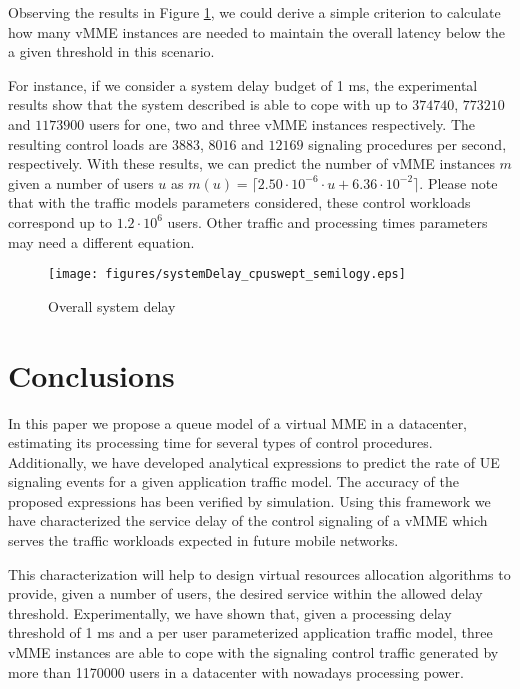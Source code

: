 \documentclass[conference]{IEEEtran}
\begin{document}
 Observing the results in Figure \ref{fig:system-delay}, we could derive a simple criterion to calculate how many vMME instances are needed to maintain the overall latency below the a given threshold in this scenario.
 
For instance, if we consider a system delay budget of 1 ms, the experimental results show that the system described is able to cope with up to $374740$, $773210$ and $1173900$ users for one, two and three vMME instances respectively. The resulting control loads are $3883$, $8016$ and $12169$ signaling procedures per second, respectively. With these results, we can predict the number of vMME instances $m$ given a number of users $u$ as $m(u)=\lceil 2.50 \cdot 10^{-6} \cdot u + 6.36\cdot 10^{-2} \rceil$.  Please note that with the traffic models parameters considered, these control workloads correspond up to $1.2\cdot 10^6$ users. Other traffic and processing times parameters may need a different equation. 





\begin{figure}[tb]
\begin{center}
\texttt{[image: figures/systemDelay\_cpuswept\_semilogy.eps]}
\end{center}
\caption{Overall system delay}
\label{fig:system-delay}
\end{figure}


\section{Conclusions}
\label{sec:conclusions}
 
  In this paper we propose a queue model of a virtual MME in a datacenter, estimating its processing time for several types of control procedures.  Additionally, we have developed analytical expressions to predict the rate of UE signaling events for a given application traffic model. The accuracy of the proposed expressions has been verified by simulation.
  Using this framework we have characterized the service delay of the control signaling of a vMME which serves the traffic workloads expected in future mobile networks. 
    
  This characterization will help to design virtual resources allocation algorithms to provide, given a number of users, the desired service within the allowed delay threshold. Experimentally, we have shown that, given a processing delay threshold of 1 ms and a per user parameterized application traffic model, three vMME instances are able to cope with the signaling control traffic generated by more than 1170000 users in a datacenter with nowadays processing power.
  
\end{document}
